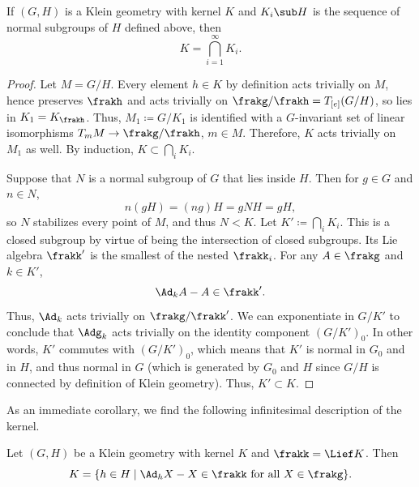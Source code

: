 \begin{lem}
    If $(G,H)$ is a Klein geometry with kernel $K$ and $K_i\sub H$ is the sequence of normal subgroups of $H$ defined above, then 
    \[K=\bigcap_{i=1}^\infty K_i.\]
\end{lem}
\begin{proof}
    Let $M=G\slash H$. Every element $h\in K$ by definition acts trivially on $M$, hence preserves $\frakh$ and acts trivially on $\frakg\slash\frakh=T_{[e]}(G\slash H)$, so lies in $K_1=K_{\frakh}$. Thus, $M_1\coloneqq G\slash K_1$ is identified with a $G$-invariant set of linear isomorphisms $T_m M\to \frakg\slash\frakh$, $m\in M$. Therefore, $K$ acts trivially on $M_1$ as well. By induction, $K\subset \bigcap_i K_i$.


    Suppose that $N$ is a normal subgroup of $G$ that lies inside $H$. Then for $g\in G$ and $n\in N$,
    \[n(gH)=(ng)H=gNH=gH,\]
    so $N$ stabilizes every point of $M$, and thus $N<K$. Let $K'\coloneqq \bigcap_i K_i$. This is a closed subgroup by virtue of being the intersection of closed subgroups. Its Lie algebra $\frakk'$ is the smallest of the nested $\frakk_i$. For any $A\in\frakg$ and $k\in K'$, 
    \[\Ad_k A-A\in\frakk'.\]
    Thus, $\Ad_k$ acts trivially on $\frakg\slash\frakk'$. We can exponentiate in $G\slash K'$ to conclude that $\Adg_k$ acts trivially on the identity component $(G\slash K')_0$. In other words, $K'$ commutes with $(G\slash K')_0$, which means that $K'$ is normal in $G_0$ and in $H$, and thus normal in $G$ (which is generated by $G_0$ and $H$ since $G\slash H$ is connected by definition of Klein geometry). Thus, $K'\subset K$.
\end{proof}

As an immediate corollary, we find the following infinitesimal description of the kernel.

\begin{thm}\label{thm 4.1 Sharpe}
    Let $(G,H)$ be a Klein geometry with kernel $K$ and $\frakk=\Lief K$. Then 
    \[K=\{h\in H\mid \Ad_h X-X\in\frakk \text{ for all }X\in\frakg\}.\]
\end{thm}

